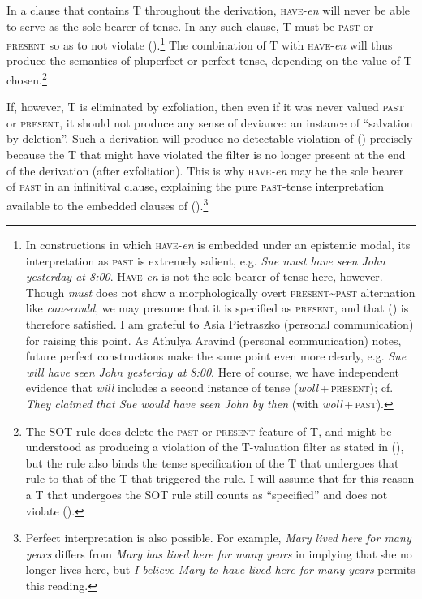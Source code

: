 \documentclass[output=paper]{langscibook}
\begin{document}
\noindent  In a clause that contains T throughout the derivation, \textsc{have}-\textit{en} will never be able to serve as the sole bearer of tense. In any such clause, T must be \textsc{past} or \textsc{present} so as to not violate ().\footnote{In constructions in which \textsc{have}-\textit{en} is embedded under an epistemic modal, its interpretation as \textsc{past} is extremely salient, e.g. \textit{Sue must have seen John} \textit{yesterday at 8:00}. \textsc{Have-}\textit{en} is not the sole bearer of tense here, however. Though \textit{must} does not show a morphologically overt \textsc{present\textasciitilde past} alternation like \textit{can\textasciitilde could}, we may presume that it is specified as \textsc{present}, and that () is therefore satisfied. I am grateful to Asia Pietraszko (personal communication) for raising this point. As Athulya Aravind (personal communication) notes, future perfect constructions make the same point even more clearly, e.g. \textit{Sue will have seen John yesterday at 8:00}. Here of course, we have independent evidence that \textit{will} includes a second instance of tense (\textit{woll}\,+\,\textsc{present}); cf. \textit{They claimed that Sue would have seen John by then} (with \textit{woll}\,+\,\textsc{past}).} The combination of T with \textsc{have-}\textit{en} will thus produce the semantics of pluperfect or perfect tense, depending on the value of T chosen.\footnote{The SOT rule does delete the \textsc{past} or \textsc{present} feature of T, and might be understood as producing a violation of the T-valuation filter as stated in (), but the rule also binds the tense specification of the T that undergoes that rule to that of the T that triggered the rule. I will assume that for this reason a T that undergoes the SOT rule still counts as “specified” and does not violate ().}

If, however, T is eliminated by exfoliation, then even if it was never valued \textsc{past} or \textsc{present}, it should not produce any sense of deviance: an instance of “salvation by deletion”. Such a derivation will produce no detectable violation of () precisely because the T that might have violated the filter is no longer present at the end of the derivation (after exfoliation). This is why \textsc{have}\textit{-en} may be the sole bearer of \textsc{past} in an infinitival clause, explaining the pure \textsc{past}-tense interpretation available to the embedded clauses of ().\footnote{Perfect interpretation is also possible. For example, \textit{Mary lived here for many years} differs from \textit{Mary has lived here for many years} in implying that she no longer lives here, but \textit{I believe Mary to have lived here for many years} permits this reading.} 
\end{document}
